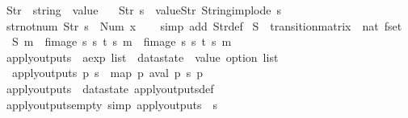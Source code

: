\begin{isabellebody}
\isanewline
{}\isamarkupfalse%
\ Str\ {\isacharcolon}{\isacharcolon}\ {\isachardoublequoteopen}string\ {\isasymRightarrow}\ value{\isachardoublequoteclose}\ \isanewline
\ \ {\isachardoublequoteopen}Str\ s\ {\isasymequiv}\ value{\isachardot}Str\ {\isacharparenleft}String{\isachardot}implode\ s{\isacharparenright}{\isachardoublequoteclose}\isanewline
\isanewline
{}\isamarkupfalse%
\ str{\isacharunderscore}not{\isacharunderscore}num{\isacharcolon}\ {\isachardoublequoteopen}Str\ s\ {\isasymnoteq}\ Num\ x{}{\isachardoublequoteclose}\isanewline
%
\isadelimproof
\ \ %
\endisadelimproof
%
\isatagproof
{}\isamarkupfalse%
\ {\isacharparenleft}simp\ add{\isacharcolon}\ Str{\isacharunderscore}def{\isacharparenright}%
\endisatagproof
{\isafoldproof}%
%
\isadelimproof
\isanewline
%
\endisadelimproof
\isanewline
{}\isamarkupfalse%
\ S\ {\isacharcolon}{\isacharcolon}\ {\isachardoublequoteopen}transition{\isacharunderscore}matrix\ {\isasymRightarrow}\ nat\ fset{\isachardoublequoteclose}\ \isanewline
\ \ {\isachardoublequoteopen}S\ m\ {\isacharequal}\ {\isacharparenleft}fimage\ {\isacharparenleft}{\isasymlambda}{\isacharparenleft}{\isacharparenleft}s{\isacharcomma}\ s{\isacharprime}{\isacharparenright}{\isacharcomma}\ t{\isacharparenright}{\isachardot}\ s{\isacharparenright}\ m{\isacharparenright}\ {\isacharbar}{\isasymunion}{\isacharbar}\ fimage\ {\isacharparenleft}{\isasymlambda}{\isacharparenleft}{\isacharparenleft}s{\isacharcomma}\ s{\isacharprime}{\isacharparenright}{\isacharcomma}\ t{\isacharparenright}{\isachardot}\ s{\isacharprime}{\isacharparenright}\ m{\isachardoublequoteclose}\isanewline
\isanewline
{}\isamarkupfalse%
\ apply{\isacharunderscore}outputs\ {\isacharcolon}{\isacharcolon}\ {\isachardoublequoteopen}aexp\ list\ {\isasymRightarrow}\ datastate\ {\isasymRightarrow}\ value\ option\ list{\isachardoublequoteclose}\ \isanewline
\ \ {\isachardoublequoteopen}apply{\isacharunderscore}outputs\ p\ s\ {\isacharequal}\ map\ {\isacharparenleft}{\isasymlambda}p{\isachardot}\ aval\ p\ s{\isacharparenright}\ p{\isachardoublequoteclose}\isanewline
\isanewline
{}\isamarkupfalse%
\ apply{\isacharunderscore}outputs\ {\isacharequal}\ datastate\ apply{\isacharunderscore}outputs{\isacharunderscore}def\isanewline
\isanewline
{}\isamarkupfalse%
\ apply{\isacharunderscore}outputs{\isacharunderscore}empty\ {\isacharbrackleft}simp{\isacharbrackright}{\isacharcolon}\ {\isachardoublequoteopen}apply{\isacharunderscore}outputs\ {\isacharbrackleft}{\isacharbrackright}\ s\ {\isacharequal}\ {\isacharbrackleft}{\isacharbrackright}{\isachardoublequoteclose}\isanewline

\end{isabellebody}
